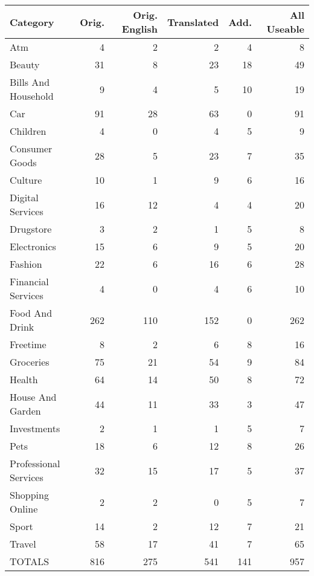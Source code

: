\begin{tabular}{lrrrrr}
\toprule
             Category &  Orig. &  Orig. English &  Translated &  Add. &  All Useable \\
\midrule
                  Atm &      4 &              2 &           2 &     4 &            8 \\
               Beauty &     31 &              8 &          23 &    18 &           49 \\
  Bills And Household &      9 &              4 &           5 &    10 &           19 \\
                  Car &     91 &             28 &          63 &     0 &           91 \\
             Children &      4 &              0 &           4 &     5 &            9 \\
       Consumer Goods &     28 &              5 &          23 &     7 &           35 \\
              Culture &     10 &              1 &           9 &     6 &           16 \\
     Digital Services &     16 &             12 &           4 &     4 &           20 \\
            Drugstore &      3 &              2 &           1 &     5 &            8 \\
          Electronics &     15 &              6 &           9 &     5 &           20 \\
              Fashion &     22 &              6 &          16 &     6 &           28 \\
   Financial Services &      4 &              0 &           4 &     6 &           10 \\
       Food And Drink &    262 &            110 &         152 &     0 &          262 \\
             Freetime &      8 &              2 &           6 &     8 &           16 \\
            Groceries &     75 &             21 &          54 &     9 &           84 \\
               Health &     64 &             14 &          50 &     8 &           72 \\
     House And Garden &     44 &             11 &          33 &     3 &           47 \\
          Investments &      2 &              1 &           1 &     5 &            7 \\
                 Pets &     18 &              6 &          12 &     8 &           26 \\
Professional Services &     32 &             15 &          17 &     5 &           37 \\
      Shopping Online &      2 &              2 &           0 &     5 &            7 \\
                Sport &     14 &              2 &          12 &     7 &           21 \\
               Travel &     58 &             17 &          41 &     7 &           65 \\
               TOTALS &    816 &            275 &         541 &   141 &          957 \\
\bottomrule
\end{tabular}

